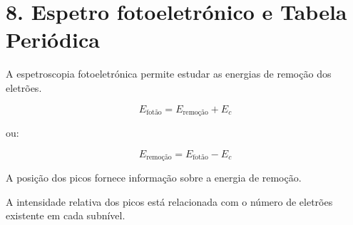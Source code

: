 \documentclass[11pt,a4paper]{article}
\begin{document}
	\newpage
	
	\section*{\textcolor{eublue}{8. Espetro fotoeletrónico e Tabela Periódica}}
	
	\begin{recorda}
		
		A espetroscopia fotoeletrónica permite estudar as energias de remoção
		dos eletrões.
		
		\[
		\boxed{
			E_{\text{fotão}}
			=
			E_{\text{remoção}}
			+
			E_c
		}
		\]
		
		ou:
		
		\[
		\boxed{
			E_{\text{remoção}}
			=
			E_{\text{fotão}}
			-
			E_c
		}
		\]
		
		A posição dos picos fornece informação sobre a energia de remoção.
		
		A intensidade relativa dos picos está relacionada com o número de
		eletrões existente em cada subnível.
		
	\end{recorda}
	
	
\end{document}
